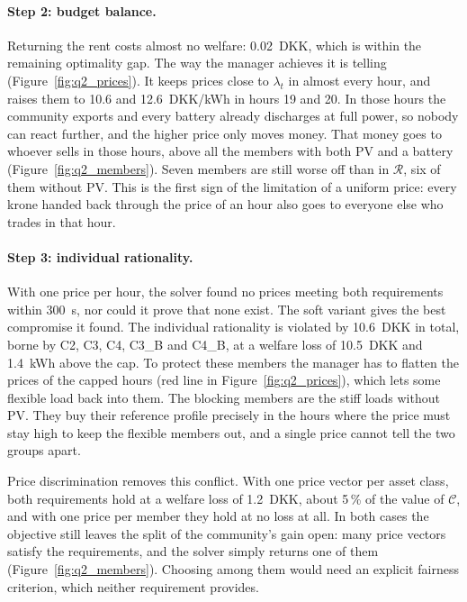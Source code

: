 \paragraph{Step 2: budget balance.}
Returning the rent costs almost no welfare: 0.02~DKK, which is within the remaining optimality gap.
The way the manager achieves it is telling (Figure~\ref{fig:q2_prices}).
It keeps prices close to $\lambda_t$ in almost every hour, and raises them to 10.6 and 12.6~DKK/kWh in hours 19 and 20.
In those hours the community exports and every battery already discharges at full power, so nobody can react further, and the higher price only moves money.
That money goes to whoever sells in those hours, above all the members with both PV and a battery (Figure~\ref{fig:q2_members}).
Seven members are still worse off than in $\mathcal{R}$, six of them without PV.
This is the first sign of the limitation of a uniform price: every krone handed back through the price of an hour also goes to everyone else who trades in that hour.

\paragraph{Step 3: individual rationality.}
With one price per hour, the solver found no prices meeting both requirements within 300~s, nor could it prove that none exist.
The soft variant gives the best compromise it found.
The individual rationality is violated by 10.6~DKK in total, borne by C2, C3, C4, C3\_B and C4\_B, at a welfare loss of 10.5~DKK and 1.4~kWh above the cap.
To protect these members the manager has to flatten the prices of the capped hours (red line in Figure~\ref{fig:q2_prices}), which lets some flexible load back into them.
The blocking members are the stiff loads without PV.
They buy their reference profile precisely in the hours where the price must stay high to keep the flexible members out, and a single price cannot tell the two groups apart.

Price discrimination removes this conflict.
With one price vector per asset class, both requirements hold at a welfare loss of 1.2~DKK, about 5\,\% of the value of $\mathcal{C}$, and with one price per member they hold at no loss at all.
In both cases the objective still leaves the split of the community's gain open: many price vectors satisfy the requirements, and the solver simply returns one of them (Figure~\ref{fig:q2_members}).
Choosing among them would need an explicit fairness criterion, which neither requirement provides.

